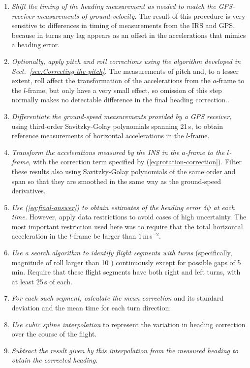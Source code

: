 \documentclass[english,british,amtd,bookmarks=false,unicode=true]{copernicus}\usepackage[]{graphicx}\usepackage[]{color}
\begin{document}
\begin{enumerate}
\item \emph{Shift the timing of the heading measurement as needed to match
the GPS-receiver measurements of ground velocity. }The result of this
procedure is very sensitive to differences in timing of measurements
from the IRS and GPS, because in turns any lag appears as an offset
in the accelerations that mimics a heading error.
\item \emph{Optionally, apply pitch and roll corrections using the algorithm
developed in Sect.~\ref{sec:Correcting-the-pitch}. }The measurements
of pitch and, to a lesser extent, roll affect the transformation of
the accelerations from the $a$-frame to the $l$-frame, but only
have a very small effect, so omission of this step normally makes
no detectable difference in the final heading correction.. 
\item \emph{Differentiate the ground-speed measurements provided by a GPS
receiver,} using third-order Savitzky-Golay polynomials spanning 21\,s,
to obtain reference measurements of horizontal accelerations in the
$l$-frame. 
\item \emph{Transform the accelerations measured by the INS in the $a$-frame
to the $l$-frame}, with the correction term specified by (\ref{eq:rotation-correction}).
Filter these results also using Savitzky-Golay polynomials of the
same order and span so that they are smoothed in the same way as the
ground-speed derivatives.
\item \emph{Use (\ref{eq:final-answer}) to obtain estimates of the heading
error $\delta\psi$ at each time.} However, apply data restrictions
to avoid cases of high uncertainty. The most important restriction
used here was to require that the total horizontal acceleration in
the $l$-frame be larger than $1$\,m\,s$^{-2}$. 
\item \emph{Use a search algorithm to identify flight segments with turns}
(specifically, magnitude of roll larger than 10$^{\circ}$) continuously
except for possible gaps of 5\,min. Require that these flight segments
have both right and left turns, with at least 25\,s of each.
\item \emph{For each such segment, calculate the mean correction} and its
standard deviation and the mean time for each turn direction.
\item \emph{Use cubic spline interpolation} to represent the variation in
heading correction over the course of the flight. 
\item \emph{Subtract the result given by this interpolation from the measured
heading to obtain the corrected heading.}
\end{enumerate}
\end{document}
